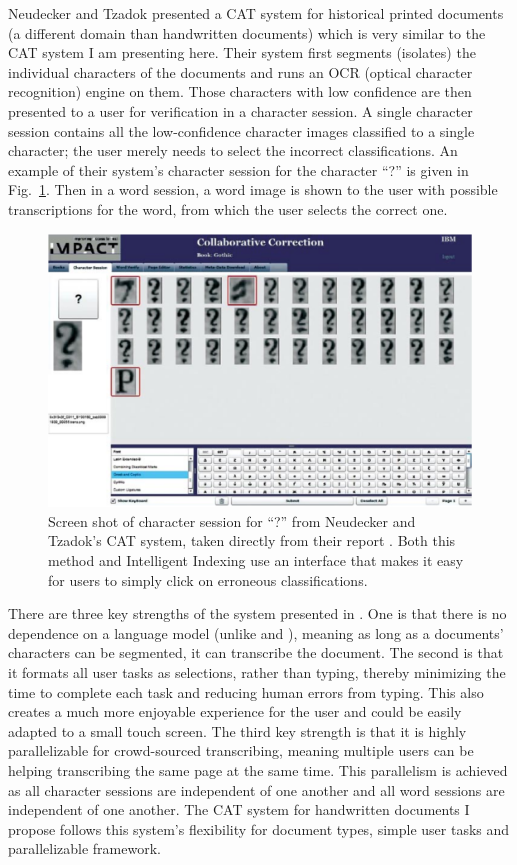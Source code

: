 \documentclass[conference]{IEEEtran}
\begin{document}
Neudecker and Tzadok\cite{Neudecker2010} presented a CAT system for historical printed documents (a different domain than handwritten documents) which is very similar to the CAT system I am presenting here. Their system first segments (isolates) the individual characters of the documents and runs an OCR (optical character recognition) engine on them. Those characters with low confidence are then presented to a user for verification in a character session. A single character session contains all the low-confidence character images classified to a single character; the user merely needs to select the incorrect classifications.
An example of their system's character session for the character ``?'' is given in Fig.~\ref{fig:carpet}. 
Then in a word session, a word image is shown to the user with possible transcriptions for the word, from which the user selects the correct one.

\begin{figure}
    \centering
    \includegraphics[width=.47\textwidth]{carpet}
    \caption{Screen shot of character session for ``?'' from Neudecker and Tzadok's CAT system, taken directly from their report \cite{Neudecker2010}. Both this method and Intelligent Indexing use an interface that makes it easy for users to simply click on erroneous classifications.}
    \label{fig:carpet}
\end{figure}

There are three key strengths of the system presented in \cite{Neudecker2010}. One is that there is no dependence on a language model (unlike \cite{Toselli2010} and \cite{Serrano2014}), meaning as long as a documents' characters can be segmented, it can transcribe the document. The second is that it formats all user tasks as selections, rather than typing, thereby minimizing the time to complete each task and reducing human errors from typing. This also creates a much more enjoyable experience for the user and could be easily adapted to a small touch screen. The third key strength is that it is highly parallelizable for crowd-sourced transcribing, meaning multiple users can be helping transcribing the same page at the same time. This parallelism is achieved as all character sessions are independent of one another and all word sessions are independent of one another. The CAT system for handwritten documents I propose follows this system's flexibility for document types, simple user tasks and parallelizable framework.
\end{document}
